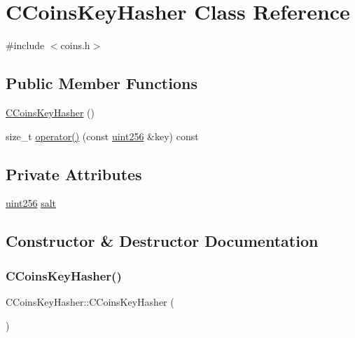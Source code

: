 \hypertarget{class_c_coins_key_hasher}{}\section{C\+Coins\+Key\+Hasher Class Reference}
\label{class_c_coins_key_hasher}


{\ttfamily \#include $<$coins.\+h$>$}

\subsection*{Public Member Functions}
\begin{DoxyCompactItemize}
\item 
\mbox{\hyperlink{class_c_coins_key_hasher_a2c2495e2dffdcbda511ed232cc47a575}{C\+Coins\+Key\+Hasher}} ()
\item 
size\+\_\+t \mbox{\hyperlink{class_c_coins_key_hasher_abf805e5472a1a3c9c29f8f3f1dd013b3}{operator()}} (const \mbox{\hyperlink{classuint256}{uint256}} \&key) const
\end{DoxyCompactItemize}
\subsection*{Private Attributes}
\begin{DoxyCompactItemize}
\item 
\mbox{\hyperlink{classuint256}{uint256}} \mbox{\hyperlink{class_c_coins_key_hasher_a142ac561b457a4d2df4506f5695a9adb}{salt}}
\end{DoxyCompactItemize}


\subsection{Constructor \& Destructor Documentation}
\mbox{\label{class_c_coins_key_hasher_a2c2495e2dffdcbda511ed232cc47a575}} 
\subsubsection{\texorpdfstring{C\+Coins\+Key\+Hasher()}{CCoinsKeyHasher()}}
{\footnotesize\ttfamily C\+Coins\+Key\+Hasher\+::\+C\+Coins\+Key\+Hasher (\begin{DoxyParamCaption}{ }\end{DoxyParamCaption})}



